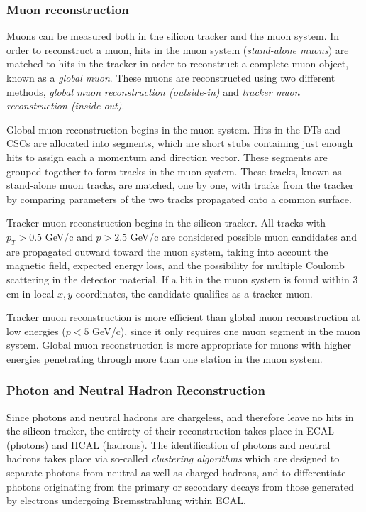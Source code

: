 \subsubsection{Muon reconstruction}

Muons can be measured both in the silicon tracker and the muon system. In order to reconstruct a muon, hits in the muon system (\emph{stand-alone muons}) are matched to hits in the tracker in order to reconstruct a complete muon object, known as a \emph{global muon}. These muons are reconstructed using two different methods, \emph{global muon reconstruction (outside-in)} and \emph{tracker muon reconstruction (inside-out)}.

Global muon reconstruction begins in the muon system. Hits in the DTs and CSCs are allocated into segments, which are short stubs containing just enough hits to assign each a momentum and direction vector. These segments are grouped together to form tracks in the muon system. These tracks, known as stand-alone muon tracks, are matched, one by one, with tracks from the tracker by comparing parameters of the two tracks propagated onto a common surface.

Tracker muon reconstruction begins in the silicon tracker. All tracks with $p_{T} > 0.5$ GeV/c and $p > 2.5$ GeV/c are considered possible muon candidates and are propagated outward toward the muon system, taking into account the magnetic field, expected energy loss, and the possibility for multiple Coulomb scattering in the detector material. If a hit in the muon system is found within 3 cm in local $x, y$ coordinates, the candidate qualifies as a tracker muon.

Tracker muon reconstruction is more efficient than global muon reconstruction at low energies ($p < 5$ GeV/c), since it only requires one muon segment in the muon system. Global muon reconstruction is more appropriate for muons with higher energies penetrating through more than one station in the muon system.


\subsubsection{Photon and Neutral Hadron Reconstruction}

Since photons and neutral hadrons are chargeless, and therefore leave no hits in the silicon tracker, the entirety of their reconstruction takes place in ECAL (photons) and HCAL (hadrons). The identification of photons and neutral hadrons takes place via so-called \emph{clustering algorithms} which are designed to separate photons from neutral as well as charged hadrons, and to differentiate photons originating from the primary or secondary decays from those generated by electrons undergoing Bremsstrahlung within ECAL.

